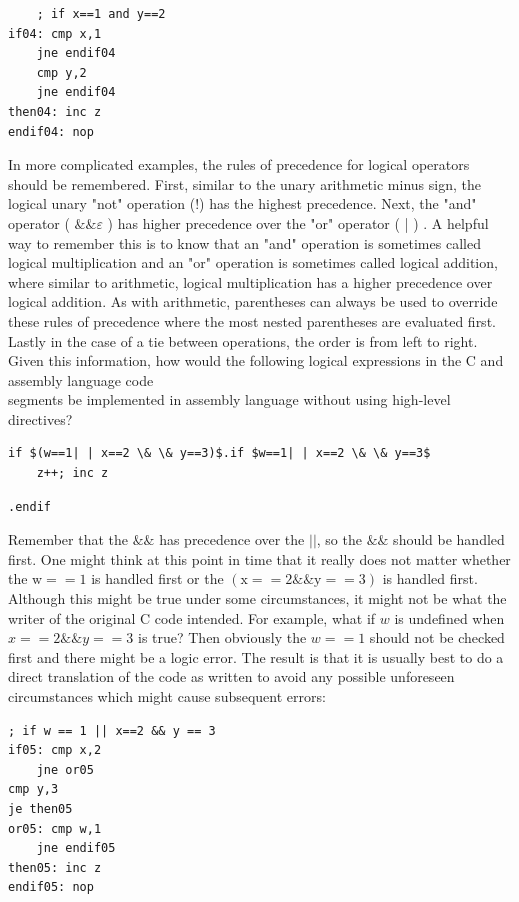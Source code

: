 \documentclass[10pt]{article}
\begin{document}
\begin{verbatim}
    ; if x==1 and y==2
if04: cmp x,1
    jne endif04
    cmp y,2
    jne endif04
then04: inc z
endif04: nop
\end{verbatim}

In more complicated examples, the rules of precedence for logical operators should be remembered. First, similar to the unary arithmetic minus sign, the logical unary "not" operation (!) has the highest precedence. Next, the "and" operator ( $\& \& \varepsilon$ ) has higher precedence over the "or" operator ( | ) . A helpful way to remember this is to know that an "and" operation is sometimes called logical multiplication and an "or" operation is sometimes called logical addition, where similar to arithmetic, logical multiplication has a higher precedence over logical addition. As with arithmetic, parentheses can always be used to override these rules of precedence where the most nested parentheses are evaluated first. Lastly in the case of a tie between operations, the order is from left to right. Given this information, how would the following logical expressions in the C and assembly language code\\
segments be implemented in assembly language without using high-level directives?

\begin{verbatim}
if $(w==1| | x==2 \& \& y==3)$.if $w==1| | x==2 \& \& y==3$
    z++; inc z
\end{verbatim}

\begin{verbatim}
.endif
\end{verbatim}

Remember that the $\& \&$ has precedence over the $|\mid$, so the $\& \&$ should be handled first. One might think at this point in time that it really does not matter whether the $\mathrm{w}==1$ is handled first or the $(\mathrm{x}==2 \& \& \mathrm{y}==3)$ is handled first. Although this might be true under some circumstances, it might not be what the writer of the original C code intended. For example, what if $w$ is undefined when $x==2 \& \& y==3$ is true? Then obviously the $w==1$ should not be checked first and there might be a logic error. The result is that it is usually best to do a direct translation of the code as written to avoid any possible unforeseen circumstances which might cause subsequent errors:

\begin{verbatim}
; if w == 1 || x==2 && y == 3
if05: cmp x,2
    jne or05
cmp y,3
je then05
or05: cmp w,1
    jne endif05
then05: inc z
endif05: nop
\end{verbatim}
\end{document}
